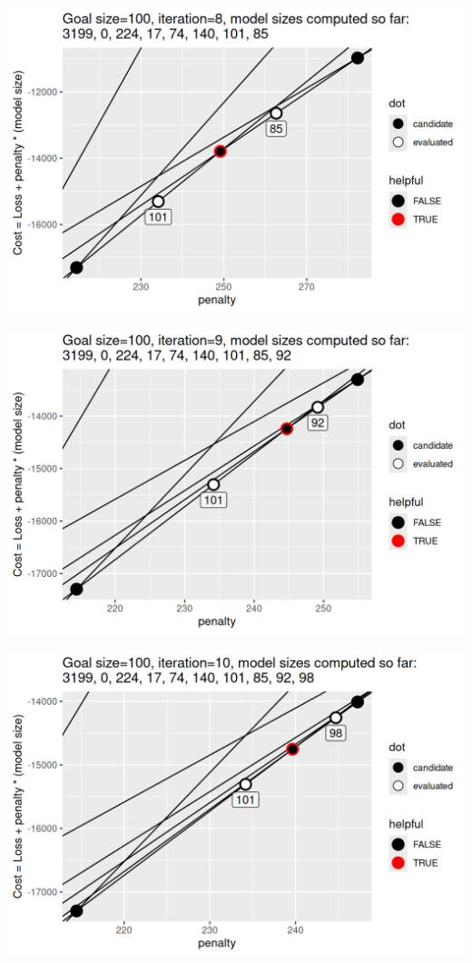 \begin{frame}
  \includegraphics[width=\textwidth]{figure-sequential-search-8.png}
\end{frame}
 
\begin{frame}
  \includegraphics[width=\textwidth]{figure-sequential-search-9.png}
\end{frame}
 
\begin{frame}
  \includegraphics[width=\textwidth]{figure-sequential-search-10.png}
\end{frame}
 
